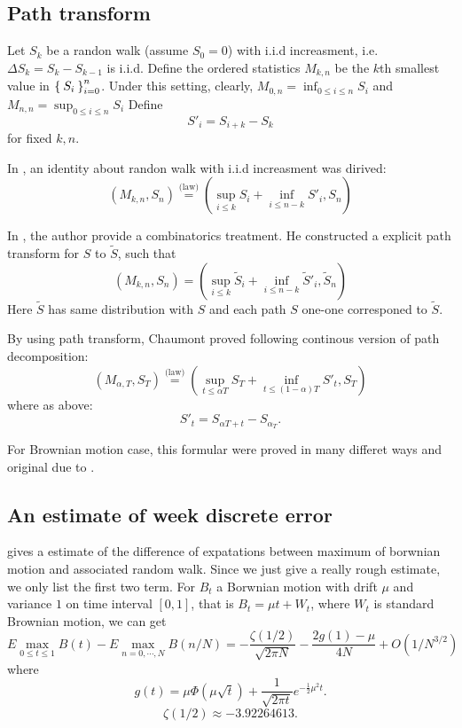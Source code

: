 \documentclass[12pt,oneside,titlepage]{book}
\def\eqlaw{{\stackrel{\text{(law)}}{=}}}
\def\tS{{\widetilde{S}}}
\begin{document}
\subsection{Path transform}
Let $S_k$ be a randon walk (assume $S_0=0$)
with i.i.d increasment, i.e.
$\Delta S_k = S_k -  S_{k-1}$ is i.i.d.
Define the ordered statistics $M_{k,n}$ be the $k$th smallest value in
$\Set{S_i}_{i=0}^n$.
Under this setting, clearly, $M_{0,n} = \inf_{0\leq i\leq n}S_i$
and $M_{n,n} = \sup_{0\leq i\leq n}S_i$
Define
\[S'_i = S_{i+k}-S_k\]
for fixed $k, n$.

In \cite{Wendel1960}, an identity about randon walk with
i.i.d increasment was dirived:
\begin{equation}\label{eq:dpathdec}
(M_{k,n}, S_n) \eqlaw (\sup_{i\leq k} S_i +\inf_{i\leq n-k} S'_i, S_n)
\end{equation}

In \cite{Chaumont1999}, the author provide a combinatorics treatment.
He constructed a explicit path transform for $S$ to $\tS$, such that
\[
(M_{k,n}, S_n) = (\sup_{i\leq k} \tS_i+\inf_{i\leq n-k} \tS'_i, \tS_n)
\]
Here $\tS$ has same distribution with $S$ and each path $S$
 one-one corresponed to $\tS$.

By using path transform, Chaumont proved
following continous version of path decomposition:
\begin{equation}\label{eq:cpathdec}
(M_{\alpha,T}, S_T) \eqlaw (\sup_{t\leq \alpha{T}} S_T +\inf_{t \leq (1-\alpha)T} S'_t, S_T)
\end{equation}
where as above:
\[
S'_t = S_{\alpha T+t} - S_{\alpha_T}.
\]

For Brownian motion case, this formular were proved in many differet ways
and original due to \cite{Dassios1995}.

\subsection{An estimate of week discrete error}
\cite{Janssen2008} gives a estimate of the difference of  expatations
between maximum of borwnian motion and associated random walk.
Since we just give a really rough estimate, we only list the first two term.
For $B_t$ a Borwnian motion with drift $\mu$ and variance $1$ on time interval $[0,1]$, that is $B_t = \mu t + W_t$, where $W_t$ is standard Brownian motion, we can get
\begin{equation}\label{eq:est1}
E\max_{0\leq t \leq 1} B(t) - E\max_{n=0,\cdots, N}B(n/N)
= -\frac{\zeta(1/2)}{\sqrt{2\pi N}}-\frac{2g(1)-\mu}{4N} + O(1/N^{3/2})
\end{equation}
where
\[
g(t) = \mu \Phi(\mu \sqrt{t}) + \frac{1}{\sqrt{2\pi t}} e^{-\frac{1}{2}\mu^2 t}.
\]
\[
\zeta(1/2) \approx -3.92264613.
\]
\end{document}
